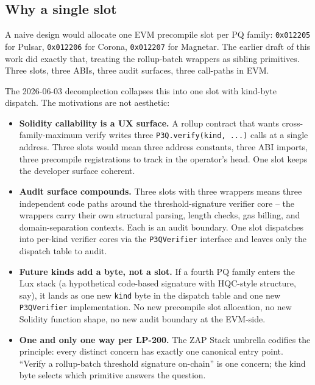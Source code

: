\subsection{Why a single slot}

A naive design would allocate one EVM precompile slot per PQ
family: \texttt{0x012205} for Pulsar, \texttt{0x012206} for
Corona, \texttt{0x012207} for Magnetar. The earlier draft of this
work did exactly that, treating the rollup-batch wrappers as
sibling primitives. Three slots, three ABIs, three audit
surfaces, three call-paths in EVM.

The 2026-06-03 decomplection collapses this into one slot with
kind-byte dispatch. The motivations are not aesthetic:

\begin{itemize}[leftmargin=2em,nosep]
\item \textbf{Solidity callability is a UX surface.} A rollup
  contract that wants cross-family-maximum verify writes three
  \texttt{P3Q.verify(kind, ...)} calls at a single address. Three
  slots would mean three address constants, three ABI imports,
  three precompile registrations to track in the operator's head.
  One slot keeps the developer surface coherent.
\item \textbf{Audit surface compounds.} Three slots with three
  wrappers means three independent code paths around the
  threshold-signature verifier core -- the wrappers carry their
  own structural parsing, length checks, gas billing, and
  domain-separation contexts. Each is an audit boundary. One
  slot dispatches into per-kind verifier cores via the
  \texttt{P3QVerifier} interface and leaves only the dispatch
  table to audit.
\item \textbf{Future kinds add a byte, not a slot.} If a fourth
  PQ family enters the Lux stack (a hypothetical code-based
  signature with HQC-style structure, say), it lands as one new
  \texttt{kind} byte in the dispatch table and one new
  \texttt{P3QVerifier} implementation. No new precompile slot
  allocation, no new Solidity function shape, no new audit
  boundary at the EVM-side.
\item \textbf{One and only one way per LP-200.} The ZAP Stack
  umbrella codifies the principle: every distinct concern has
  exactly one canonical entry point. ``Verify a rollup-batch
  threshold signature on-chain'' is one concern; the kind byte
  selects which primitive answers the question.
\end{itemize}

